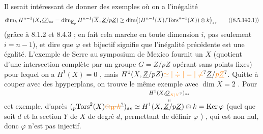  Il serait intéressant de donner des exemples où   on a l'inégalité
\[
\dim_k H^{n-1}(X,\underline O)_{ss}=\dim_{\underline{\mathrm F}_p}H^{n-1}(\overline X,\underline Z/p\underline Z)\handwritten{\geq}\dim\bigl((H^{\handwritten{n-1}}(X)/\mathrm{Tors}^{n-1}(X))\otimes k\bigr)_{ss}
\tag*{\inserted{(8.5.1\deleted{1}0.1)}}
\]
(grâce à 8.1.2 et 8.4.3 ; en fait cela marche en toute dimension $i$, pas seulement $i=n-1$), et dire que $\varphi$ est bijectif signifie que l'inégalité précédente est une égalité. L'exemple de Serre au symposium de Mexico fournit un $X$ (quotient d'une intersection complète par un groupe $G=\underline Z/p\underline Z$ opérant sans points fixes) pour lequel on a $H^1(X)=0$ , mais $H^1(X,\underline Z/pZ)\unsure{\simeq|\doteqdot|=|\ne}\underline Z/\unsure{p\underline Z}$. Quitte à couper avec des hpyperplans, on trouve le même exemple avec $\dim X=2$ . Pour cet exemple,  d'après   $(\handwritten{{}_p}\mathrm{Tors}^{\handwritten{2}}(X)\deleted{\unsure{\otimes_W k}})_{ss}\simeq\overset{\handwritten{H^1(X,\underline O_{\unsure{X|Y}})_{ss}}}{\overset{\handwritten{\shortparallel}}{H^1(X,\underline Z/p\underline Z)\otimes k}}=\mathrm{Ker}\,\handwritten{\varphi}$ (quel que soit $d$ et la section $Y$ de $X$ de degré $d$, permettant de définir $\varphi$ ) , qui est non nul, donc $\varphi$ n'est pas injectif. 

